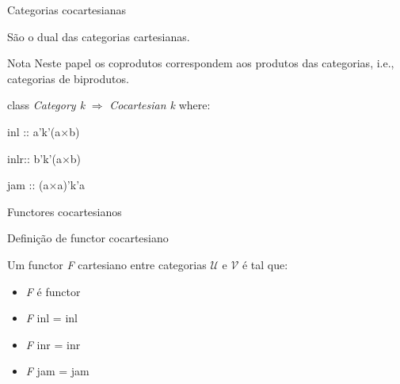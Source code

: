 \documentclass{beamer}
\begin{document}
\begin{frame}{Categorias cocartesianas}

São o dual das categorias cartesianas.
\begin{block}{Nota}
Neste papel os coprodutos correspondem aos produtos das categorias, i.e., categorias de biprodutos.
\end{block}

\begin{block}

class \textit{Category k} $\Rightarrow$ \textit{Cocartesian k} where:

\hspace{0.2cm}inl :: a'k'(a$\times$b)

\hspace{0.2cm}inlr:: b'k'(a$\times$b)

\hspace{0.2cm}jam :: (a$\times$a)'k'a

\end{block}


\end{frame}


\begin{frame}{Functores cocartesianos}

\begin{block}{Definição de functor cocartesiano}


Um functor \textit{F} cartesiano entre categorias $\mathcal{U}$ e $\mathcal{V}$ é tal que:
\begin{itemize}
    \item \textit{F} é functor 
    \item \textit{F} inl = inl
    \item \textit{F} inr = inr
    \item \textit{F} jam = jam
\end{itemize}


\end{block}


\end{frame}
\end{document}
